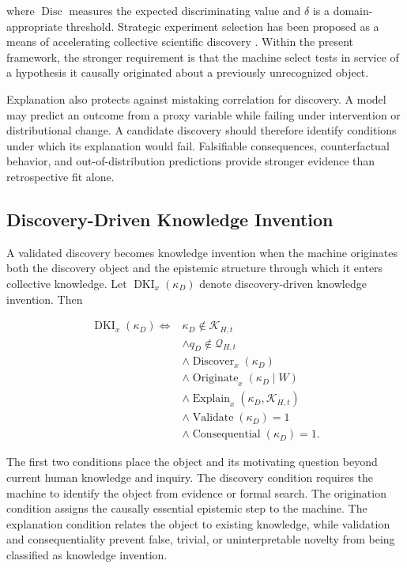where $\operatorname{Disc}$ measures the expected discriminating value and
$\delta$ is a domain-appropriate threshold. Strategic experiment selection has
been proposed as a means of accelerating collective scientific discovery
\cite{rzhetsky2015experiments}. Within the present framework, the stronger
requirement is that the machine select tests in service of a hypothesis it
causally originated about a previously unrecognized object.

Explanation also protects against mistaking correlation for discovery. A model
may predict an outcome from a proxy variable while failing under intervention
or distributional change. A candidate discovery should therefore identify
conditions under which its explanation would fail. Falsifiable consequences,
counterfactual behavior, and out-of-distribution predictions provide stronger
evidence than retrospective fit alone.

\subsection{\textbf{Discovery-Driven Knowledge Invention}}

A validated discovery becomes knowledge invention when the machine originates
both the discovery object and the epistemic structure through which it enters
collective knowledge. Let $\operatorname{DKI}_{x}(\kappa_D)$ denote
discovery-driven knowledge invention. Then

\begin{equation}
\begin{aligned}
\operatorname{DKI}_{x}(\kappa_D)
\Longleftrightarrow{}&
\kappa_D\notin\mathcal{K}_{H,t}\\
&\land q_D\notin\mathcal{Q}_{H,t}\\
&\land \operatorname{Discover}_{x}(\kappa_D)\\
&\land \operatorname{Originate}_{x}(\kappa_D\mid W)\\
&\land \operatorname{Explain}_{x}
(\kappa_D,\mathcal{K}_{H,t})\\
&\land \operatorname{Validate}(\kappa_D)=1\\
&\land \operatorname{Consequential}(\kappa_D)=1.
\end{aligned}
\label{eq:discovery_knowledge_invention}
\end{equation}

The first two conditions place the object and its motivating question beyond
current human knowledge and inquiry. The discovery condition requires the
machine to identify the object from evidence or formal search. The origination
condition assigns the causally essential epistemic step to the machine. The
explanation condition relates the object to existing knowledge, while
validation and consequentiality prevent false, trivial, or uninterpretable
novelty from being classified as knowledge invention.

